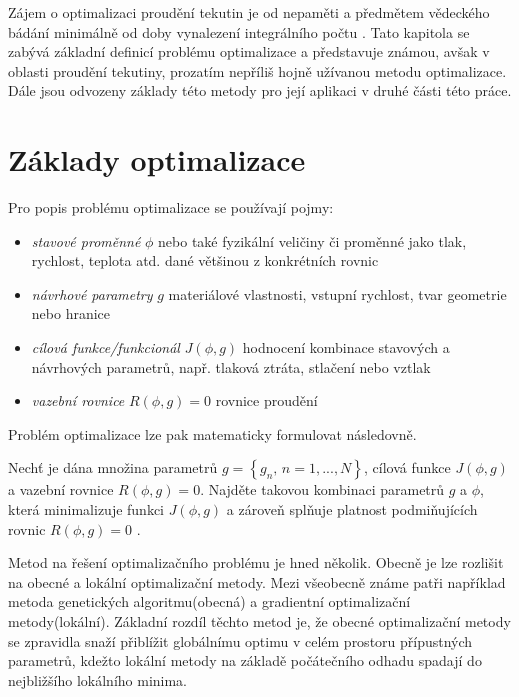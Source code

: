 Zájem o optimalizaci proudění tekutin je od nepaměti a předmětem vědeckého bádání minimálně od doby vynalezení integrálního počtu \cite{karman1997inverse}. Tato kapitola se zabývá základní definicí problému optimalizace a představuje známou, avšak v oblasti proudění tekutiny, prozatím nepříliš hojně užívanou metodu optimalizace. Dále jsou odvozeny základy této metody pro její aplikaci v druhé části této práce.
\section{Základy optimalizace}\label{sec:zaklady_opt}
Pro popis problému optimalizace se používají pojmy:
\begin{itemize}
	\item \textit{stavové proměnné} $ \phi $ nebo také fyzikální veličiny či proměnné jako tlak, rychlost, teplota atd. dané většinou z konkrétních rovnic
	\item \textit{návrhové parametry} $ g $ materiálové vlastnosti, vstupní rychlost, tvar geometrie nebo hranice
	\item \textit{cílová funkce/funkcionál} $ J(\phi,g) $ hodnocení kombinace stavových a návrhových parametrů, např. tlaková ztráta, stlačení nebo vztlak
	\item \textit{vazební rovnice} $ R(\phi,g)=0 $ rovnice proudění
\end{itemize}
Problém optimalizace lze pak matematicky formulovat následovně. \cite{karman1997inverse}
\begin{problem}\label{prob:optimalizace}
Nechť je dána množina parametrů $ g=\left\lbrace g_n, \, n=1,...,N\right\rbrace $, cílová funkce $ J(\phi, g) $ a vazební rovnice $ R(\phi, g)=0 $. 
Najděte takovou kombinaci parametrů $ g $ a $ \phi $, která minimalizuje funkci $ J(\phi, g) $ a zároveň splňuje platnost podmiňujících rovnic $ R(\phi, g)=0$ . 
\end{problem}
Metod na řešení optimalizačního problému je hned několik.
Obecně je lze rozlišit na obecné a lokální optimalizační metody. Mezi všeobecně známe patři například metoda genetických algoritmu(obecná) a gradientní optimalizační metody(lokální). 
Základní rozdíl těchto metod je, že obecné optimalizační metody se zpravidla snaží přiblížit globálnímu optimu v celém prostoru přípustných parametrů, kdežto lokální metody na základě počátečního odhadu spadají do nejbližšího lokálního minima.

